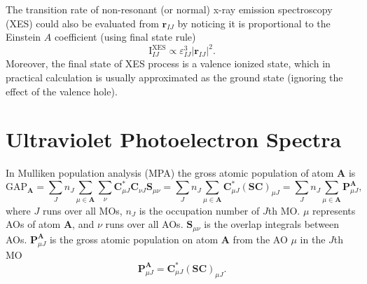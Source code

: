 \documentclass[a4paper,11pt,twoside,openright]{book}
\begin{document}
The transition rate of non-resonant (or normal) x-ray emission spectroscopy (XES) could also
be evaluated from $\boldsymbol{r}_{IJ}$ by noticing it is proportional to the Einstein $A$ coefficient
(using final state rule)
\begin{equation}
  \text{I}^{\text{XES}}_{IJ}\propto\varepsilon_{IJ}^{3}|\boldsymbol{r}_{IJ}|^{2}.
\end{equation}
Moreover, the final state of XES process is a valence ionized state, which in practical
calculation is usually approximated as the ground state (ignoring the effect of the valence hole).

\section{Ultraviolet Photoelectron Spectra}
\label{section-UPS}

In Mulliken population analysis (MPA) the gross atomic population of atom $\boldsymbol{A}$ is
\begin{equation}
  \text{GAP}_{\boldsymbol{A}}
    =\sum_{J}n_{J}\sum_{\mu\in\boldsymbol{A}}\sum_{\nu}\mathbf{C}^{*}_{\mu J}\mathbf{C}_{\nu J}\mathbf{S}_{\mu\nu}
    =\sum_{J}n_{J}\sum_{\mu\in\boldsymbol{A}}\mathbf{C}^{*}_{\mu J}(\mathbf{SC})_{\mu J}
    =\sum_{J}n_{J}\sum_{\mu\in\boldsymbol{A}}\mathbf{P}_{\mu J}^{\boldsymbol{A}},
\end{equation}
where $J$ runs over all MOs, $n_{J}$ is the occupation number of $J$th MO. $\mu$ represents
AOs of atom $\boldsymbol{A}$, and $\nu$ runs over all AOs. $\mathbf{S}_{\mu\nu}$ is the overlap
integrals between AOs. $\mathbf{P}_{\mu J}^{\boldsymbol{A}}$ is the gross atomic population on
atom $\boldsymbol{A}$ from the AO $\mu$ in the $J$th MO
\begin{equation}
  \mathbf{P}_{\mu J}^{\boldsymbol{A}}=\mathbf{C}^{*}_{\mu J}(\mathbf{SC})_{\mu J}.
\end{equation}
\end{document}
